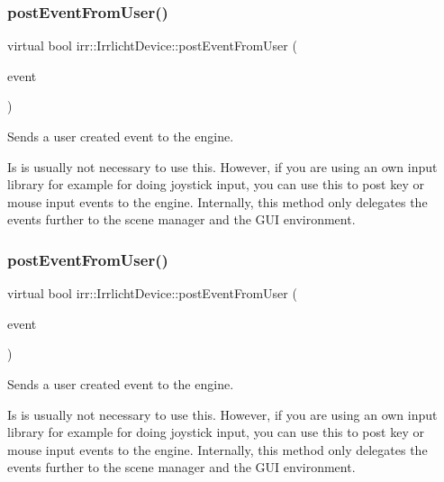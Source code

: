 \subsubsection{\texorpdfstring{post\+Event\+From\+User()}{postEventFromUser()}\hspace{0.1cm}{\footnotesize\ttfamily [1/2]}}
{\footnotesize\ttfamily virtual bool irr\+::\+Irrlicht\+Device\+::post\+Event\+From\+User (\begin{DoxyParamCaption}\item[{const \hyperlink{structirr_1_1SEvent}{S\+Event} \&}]{event }\end{DoxyParamCaption})\hspace{0.3cm}{\ttfamily [pure virtual]}}



Sends a user created event to the engine. 

Is is usually not necessary to use this. However, if you are using an own input library for example for doing joystick input, you can use this to post key or mouse input events to the engine. Internally, this method only delegates the events further to the scene manager and the G\+UI environment. \mbox{\label{classirr_1_1IrrlichtDevice_abf859e39f017b0403c6ed331e48e01df}} 
\subsubsection{\texorpdfstring{post\+Event\+From\+User()}{postEventFromUser()}\hspace{0.1cm}{\footnotesize\ttfamily [2/2]}}
{\footnotesize\ttfamily virtual bool irr\+::\+Irrlicht\+Device\+::post\+Event\+From\+User (\begin{DoxyParamCaption}\item[{const \hyperlink{structirr_1_1SEvent}{S\+Event} \&}]{event }\end{DoxyParamCaption})\hspace{0.3cm}{\ttfamily [pure virtual]}}



Sends a user created event to the engine. 

Is is usually not necessary to use this. However, if you are using an own input library for example for doing joystick input, you can use this to post key or mouse input events to the engine. Internally, this method only delegates the events further to the scene manager and the G\+UI environment. \mbox{\label{classirr_1_1IrrlichtDevice_a0489f8151dc43f6f41503ffb5a160b35}} 
